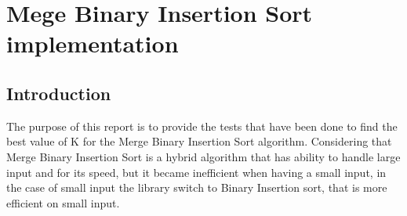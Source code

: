 \section{Mege Binary Insertion Sort implementation}
\subsection{Introduction}
The purpose of this report is to provide the tests that have been done to find the best value of K for the Merge Binary Insertion Sort algorithm.
Considering that Merge Binary Insertion Sort is a hybrid algorithm that has ability to handle large input and for its speed, but it became inefficient when having a small input, in the case of small input the library switch to Binary Insertion sort, that is more efficient on small input.

